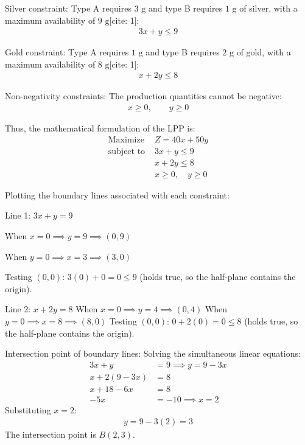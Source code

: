 \begin{enumerate}[label=\thesubsection.\arabic*, ref=\thesubsection.\theenumi]
Silver constraint:
Type A requires $3\text{ g}$ and type B requires $1\text{ g}$ of silver, with a maximum availability of $9\text{ g}$[cite: 1]:
\begin{align*}
	3x + y \le 9
\end{align*}

Gold constraint:
Type A requires $1\text{ g}$ and type B requires $2\text{ g}$ of gold, with a maximum availability of $8\text{ g}$[cite: 1]:
\begin{align*}
	x + 2y \le 8
\end{align*}

Non-negativity constraints:
The production quantities cannot be negative:
\begin{align*}
	x \ge 0, \qquad y \ge 0
\end{align*}

Thus, the mathematical formulation of the LPP is:
\begin{align*}
	\text{Maximize } & Z = 40x + 50y \\
	\text{subject to } & 3x + y \le 9 \\
	& x + 2y \le 8 \\
	& x \ge 0, \quad y \ge 0
\end{align*}

Plotting the boundary lines associated with each constraint:

Line 1: $3x + y = 9$

When $x = 0 \implies y = 9 \implies (0, 9)$

When $y = 0 \implies x = 3 \implies (3, 0)$

Testing $(0, 0)$: $3(0) + 0 = 0 \le 9$ (holds true, so the half-plane contains the origin).

Line 2: $x + 2y = 8$
When $x = 0 \implies y = 4 \implies (0, 4)$
When $y = 0 \implies x = 8 \implies (8, 0)$
Testing $(0, 0)$: $0 + 2(0) = 0 \le 8$ (holds true, so the half-plane contains the origin).

Intersection point of boundary lines:
Solving the simultaneous linear equations:
\begin{align*}
	3x + y &= 9 \implies y = 9 - 3x \\
	x + 2(9 - 3x) &= 8 \\
	x + 18 - 6x &= 8 \\
	-5x &= -10 \implies x = 2
\end{align*}
Substituting $x = 2$:
\begin{align*}
	y = 9 - 3(2) = 3
\end{align*}
The intersection point is $B(2, 3)$.


\end{enumerate}
